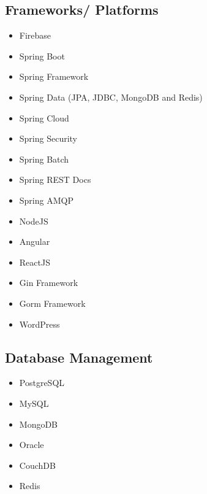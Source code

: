 \begin{cventries}
\begin{row}[cellsep=0.75cm]{3}{3}
    \begin{cell}{1}
	\section*{Frameworks/ Platforms}
	\vspace{-1.5ex}
    \begin{itemize}
        \item {Firebase}
        \item {Spring Boot}
        \item {Spring Framework}
        \item {Spring Data (JPA, JDBC, MongoDB and Redis)}
        \item {Spring Cloud}
        \item {Spring Security}
        \item {Spring Batch}
        \item {Spring REST Docs}
        \item {Spring AMQP}
        \item {NodeJS}
        \item {Angular}
        \item {ReactJS}
        \item {Gin Framework}
        \item {Gorm Framework}
        \item {WordPress}
    \end{itemize}
	\end{cell}
    \begin{cell}{1}
	\section*{Database Management}
	\vspace{-1.5ex}
    \begin{itemize}
        \item {PostgreSQL}
        \item {MySQL}
        \item {MongoDB}
        \item {Oracle}
        \item {CouchDB}
        \item {Redis}
    \end{itemize}
	\end{cell}
	\begin{cell}{1}

\end{cell}
\end{row}
\end{cventries}
